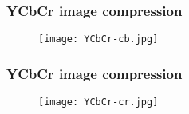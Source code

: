 \documentclass{beamer}
\begin{document}
\begin{frame}
\frametitle{YCbCr image compression}
    \begin{figure}[htb]
    \texttt{[image: YCbCr-cb.jpg]}
    \end{figure}
\end{frame}

\begin{frame}
\frametitle{YCbCr image compression}
    \begin{figure}[htb]
    \texttt{[image: YCbCr-cr.jpg]}
    \end{figure}
\end{frame}
\end{document}
